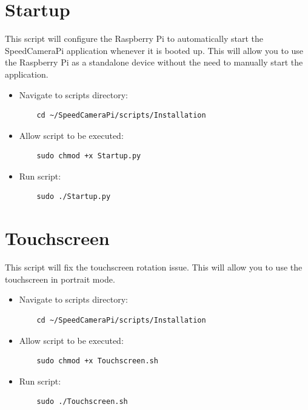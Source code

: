 \section{Startup}

This script will configure the Raspberry Pi to automatically start the SpeedCameraPi application whenever it is booted up. This will allow you to use the Raspberry Pi as a standalone device without the need to manually start the application.

\begin{itemize}
      \item Navigate to scripts directory:

            \begin{lstlisting}
    cd ~/SpeedCameraPi/scripts/Installation
    \end{lstlisting}

      \item Allow script to be executed:

            \begin{lstlisting}
    sudo chmod +x Startup.py
    \end{lstlisting}

      \item Run script:

            \begin{lstlisting}
    sudo ./Startup.py
    \end{lstlisting}
\end{itemize}

\section{Touchscreen}

This script will fix the touchscreen rotation issue. This will allow you to use the touchscreen in portrait mode.

\begin{itemize}
      \item Navigate to scripts directory:

            \begin{lstlisting}
    cd ~/SpeedCameraPi/scripts/Installation
    \end{lstlisting}

      \item Allow script to be executed:

            \begin{lstlisting}
    sudo chmod +x Touchscreen.sh
    \end{lstlisting}

      \item Run script:

            \begin{lstlisting}
    sudo ./Touchscreen.sh
    \end{lstlisting}
\end{itemize}

